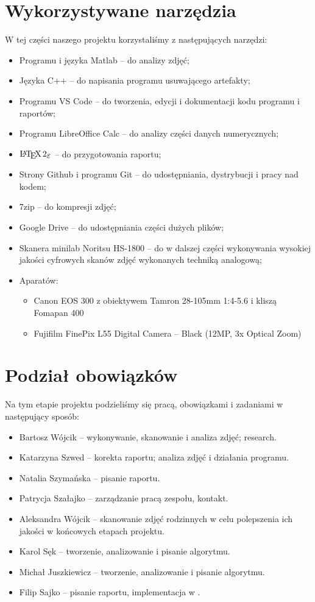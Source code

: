 \documentclass[]{mwart}
\begin{document}
\section{Wykorzystywane narzędzia}
W tej części naszego projektu korzystaliśmy z następujących narzędzi:
\begin{itemize}
    \item Programu i języka Matlab -- do analizy zdjęć;
    \item Języka C++ -- do napisania programu usuwającego artefakty;
    \item Programu VS Code -- do tworzenia, edycji i dokumentacji kodu programu i raportów;
    \item Programu LibreOffice Calc -- do analizy części danych numerycznych;
    \item $\LaTeXe{}$ -- do przygotowania raportu;
    \item Strony Github i programu Git -- do udostępniania, dystrybucji i pracy nad kodem;
    \item 7zip -- do kompresji zdjęć;
    \item Google Drive -- do udostępniania części dużych plików;
    \item Skanera minilab Noritsu HS-1800 -- do w dalszej części wykonywania wysokiej jakości cyfrowych skanów zdjęć wykonanych techniką analogową;
    \item Aparatów:
          \begin{itemize}
              \item Canon EOS 300 z obiektywem Tamron 28-105mm 1:4-5.6 i kliszą Fomapan 400
              \item Fujifilm FinePix L55 Digital Camera -- Black (12MP, 3x Optical Zoom)
          \end{itemize}
\end{itemize}


\section{Podział obowiązków}
Na tym etapie projektu podzieliśmy się pracą, obowiązkami i zadaniami w następujący sposób:
\begin{itemize}
    \item Bartosz Wójcik -- wykonywanie, skanowanie i analiza zdjęć; research.
    \item Katarzyna Szwed -- korekta raportu; analiza zdjęć i działania programu.
    \item Natalia Szymańska -- pisanie raportu.
    \item Patrycja Szałajko -- zarządzanie pracą zespołu, kontakt.
    \item Aleksandra Wójcik -- skanowanie zdjęć rodzinnych w celu polepszenia ich jakości w końcowych etapach projektu.
    \item Karol Sęk -- tworzenie, analizowanie i pisanie algorytmu.
    \item Michał Juszkiewicz -- tworzenie, analizowanie i pisanie algorytmu.
    \item Filip Sajko -- pisanie raportu, implementacja w \LaTeXe{}.
\end{itemize}
\end{document}
